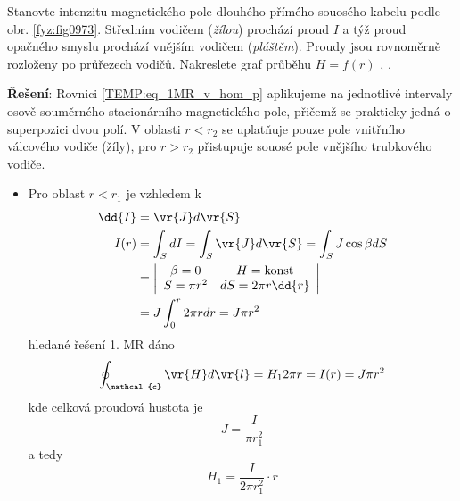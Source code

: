 \begin{mdframed}[style=mdexam]
  \begin{example}\label{TEMP:ex_koax_H}
    Stanovte intenzitu magnetického pole dlouhého přímého souosého kabelu podle obr.
    \ref{fyz:fig0973}. Středním vodičem (\emph{žílou}) prochází proud $I$ a týž proud
    opačného smyslu prochází vnějším vodičem (\emph{pláštěm}). Proudy jsou rovnoměrně rozloženy po
    průřezech vodičů. Nakreslete graf průběhu $H = f(r)$ \cite[s.~92]{Dufek1970},
    \cite[s.~195]{Kotlan1999}.
    
    {\centering
         \hspace{1em}
    \captionsetup{type=figure}  
    \label{fyz:fig0973}
    \par}
 
    \textbf{Řešení}: \newline Rovnici \ref{TEMP:eq_1MR_v_hom_p} aplikujeme na jednotlivé intervaly
    osově souměrného stacionárního magnetického pole, přičemž se prakticky jedná o superpozici dvou
    polí. V oblasti $r<r_2$ se uplatňuje pouze pole vnitřního válcového vodiče (žíly), pro $r>r_2$
    přistupuje souosé pole vnějšího trubkového vodiče.
    \begin{itemize}
      \item Pro oblast $r<r_1$ je vzhledem k 
            \begin{align*}
                \dd{I}&= \vr{J}d\vr{S} \\
                I(r)  &= \int_S dI = \int_S \vr{J}d\vr{S} = \int_S J\cos\beta dS \\
                      &= \left\lvert\begin{array}{cc}
                                \beta = 0 & H = \text{konst}   \\
                              S = \pi r^2 & dS = 2\pi r\dd{r}  \\
                              \end{array}
                        \right\rvert                                           \\
                      &= J\int_0^r 2\pi rdr = J\pi r^2
            \end{align*}
            hledané řešení 1. MR dáno 
            $$\oint_{\mathcal{c}}\vr{H}d\vr{l} = H_1 2\pi r = I(r) = J\pi r^2$$ kde celková proudová
            hustota je  $$J = \frac{I}{\pi r_1^2}$$ a tedy
            $$H_1 = \frac{I}{2\pi r_1^2}\cdot r$$
            

\end{itemize}
\end{example}
\end{mdframed}
